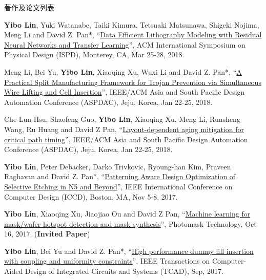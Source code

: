 \begin{rSection}{著作及论文列表}
\begin{description}[font=\normalfont, rightmargin=2em]
{}
            

\item[{[C23]}]{
        \textbf{Yibo Lin}, Yuki Watanabe, Taiki Kimura, Tetsuaki Matsunawa, Shigeki Nojima, Meng Li and David Z. Pan*, 
    ``\href{https://doi.org/10.1145/3177540.3178242}{Data Efficient Lithography Modeling with Residual Neural Networks and Transfer Learning}'', 
    ACM International Symposium on Physical Design (ISPD), Monterey, CA, Mar 25-28, 2018.
    
}
            

\item[{[C22]}]{
        Meng Li, Bei Yu, \textbf{Yibo Lin}, Xiaoqing Xu, Wuxi Li and David Z. Pan*, 
    ``\href{https://doi.org/10.1109/ASPDAC.2018.8297316}{A Practical Split Manufacturing Framework for Trojan Prevention via Simultaneous Wire Lifting and Cell Insertion}'', 
    IEEE/ACM Asia and South Pacific Design Automation Conference (ASPDAC), Jeju, Korea, Jan 22-25, 2018.
    
}
            

\item[{[C21]}]{
        Che-Lun Hsu, Shaofeng Guo, \textbf{Yibo Lin}, Xiaoqing Xu, Meng Li, Runsheng Wang, Ru Huang and David Z Pan, 
    ``\href{https://doi.org/10.1109/ASPDAC.2018.8297298}{Layout-dependent aging mitigation for critical path timing}'', 
    IEEE/ACM Asia and South Pacific Design Automation Conference (ASPDAC), Jeju, Korea, Jan 22-25, 2018.
    
}
            

\item[{[C20]}]{
        \textbf{Yibo Lin}, Peter Debacker, Darko Trivkovic, Ryoung-han Kim, Praveen Raghavan and David Z. Pan*, 
    ``\href{https://doi.org/10.1109/ICCD.2017.72}{Patterning Aware Design Optimization of Selective Etching in N5 and Beyond}'', 
    IEEE International Conference on Computer Design (ICCD), Boston, MA, Nov 5-8, 2017.
    
}
            

\item[{[C19]}]{
        \textbf{Yibo Lin}, Xiaoqing Xu, Jiaojiao Ou and David Z Pan, 
    ``\href{http://dx.doi.org/10.1117/12.2282943}{Machine learning for mask/wafer hotspot detection and mask synthesis}'', 
    Photomask Technology, Oct 16, 2017.
    (\textbf{Invited Paper})
}
            

\item[{[J18]}]{
        \textbf{Yibo Lin}, Bei Yu and David Z. Pan*, 
    ``\href{http://dx.doi.org/10.1109/TCAD.2016.2638452}{High performance dummy fill insertion with coupling and uniformity constraints}'', 
    IEEE Transactions on Computer-Aided Design of Integrated Circuits and Systems (TCAD), Sep, 2017.
    
}
\end{description}
\end{rSection}
